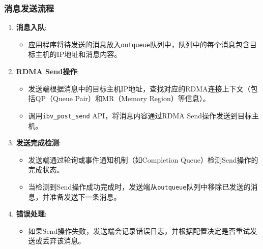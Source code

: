 {\subsubsection{消息发送流程}
\begin{enumerate}[leftmargin=1em, align=left]
    \item \textbf{消息入队}:
        \begin{itemize}[leftmargin=*, nosep]
            \item 应用程序将待发送的消息放入\texttt{outqueue}队列中，队列中的每个消息包含目标主机的IP地址和消息内容。
        \end{itemize}
    \item \textbf{RDMA Send操作}:
        \begin{itemize}[leftmargin=*, nosep]
            \item 发送端根据消息中的目标主机IP地址，查找对应的RDMA连接上下文（包括QP（Queue Pair）和MR（Memory Region）等信息）。
            \item 调用\texttt{ibv\_post\_send} API，将消息内容通过RDMA Send操作发送到目标主机。
        \end{itemize}
    \item \textbf{发送完成检测}: 
        \begin{itemize}[leftmargin=*, nosep]
            \item 发送端通过轮询或事件通知机制（如Completion Queue）检测Send操作的完成状态。
            \item 当检测到Send操作成功完成时，发送端从\texttt{outqueue}队列中移除已发送的消息，并准备发送下一条消息。
        \end{itemize}
    \item \textbf{错误处理}: 
        \begin{itemize}[leftmargin=*, nosep]
            \item 如果Send操作失败，发送端会记录错误日志，并根据配置决定是否重试发送或丢弃该消息。
        \end{itemize}
\end{enumerate}

}

